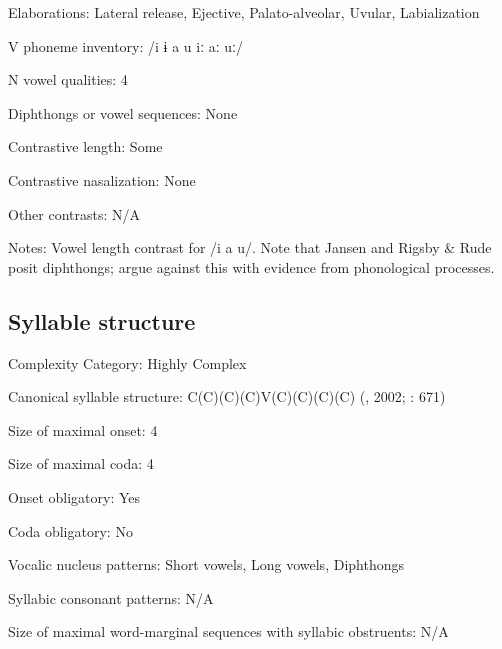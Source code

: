 {\begin{appendixdesc}
\item[Elaborations:] Lateral release, Ejective, Palato-alveolar, Uvular, Labialization

\item[V phoneme inventory:] /i ɨ a u iː aː uː/

\item[N vowel qualities:] 4

\item[Diphthongs or vowel sequences:] None

\item[Contrastive length:] Some

\item[Contrastive nasalization:] None

\item[Other contrasts:] N/A

\item[Notes:] Vowel length contrast for /i a u/. Note that Jansen and Rigsby \& Rude posit diphthongs; \citet{HargusBeavert2006} argue against this with evidence from phonological processes.
\end{appendixdesc}
\subsection*{Syllable structure}
\begin{appendixdesc}

\item[Complexity Category:] Highly Complex

\item[Canonical syllable structure:] C(C)(C)(C)V(C)(C)(C)(C) (\citealt{HargusBeavert2006}, 2002; \citealt{RigsbyRude1996}: 671)

\item[Size of maximal onset:] 4

\item[Size of maximal coda:] 4

\item[Onset obligatory:] Yes

\item[Coda obligatory:] No

\item[Vocalic nucleus patterns:] Short vowels, Long vowels, Diphthongs

\item[Syllabic consonant patterns:] N/A

\item[Size of maximal word-marginal sequences with syllabic obstruents:] N/A


\end{appendixdesc}}
